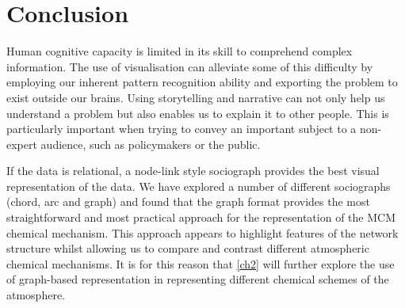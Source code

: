 %
%



\section{Conclusion}

Human cognitive capacity is limited in its skill to comprehend complex information. The use of visualisation can alleviate some of this difficulty by employing our inherent pattern recognition ability and exporting the problem to exist outside our brains. Using storytelling and narrative can not only help us understand a problem but also enables us to explain it to other people. This is particularly important when trying to convey an important subject to a non-expert audience, such as policymakers or the public.

If the data is relational, a node-link style sociograph provides the best visual representation of the data. We have explored a number of different sociographs (chord, arc and graph) and found that the graph format provides the most straightforward and most practical approach for the representation of the MCM chemical mechanism. This approach appears to highlight features of the network structure whilst allowing us to compare and contrast different atmospheric chemical mechanisms. It is for this reason that \autoref{ch2} will further explore the use of graph-based representation in representing different chemical schemes of the atmosphere.





